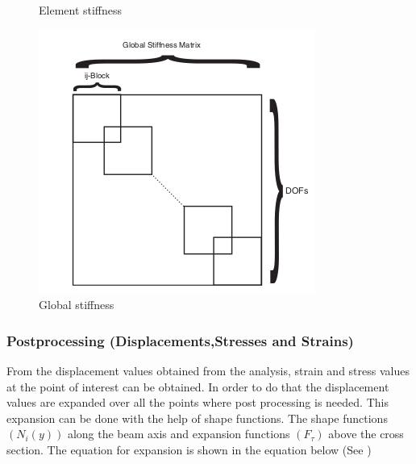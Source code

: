 \documentclass[a4paper,12pt]{article}
\begin{document}
\begin{figure}[!htbp]
\begin{minipage}[b]{0.35\textwidth}
    \caption{Element stiffness}
    \label{Elemental}
  \end{minipage}
  \hfill
  \begin{minipage}[b]{0.35\textwidth}
    \includegraphics[width=\textwidth]{5.png}
    \caption{Global stiffness}
    \label{Global}
  \end{minipage}
\end{figure}


\subsubsection*{Postprocessing (Displacements,Stresses and Strains)}
\indent\indent\indent From the displacement values obtained from the analysis,  strain and stress values at the point of interest can be obtained. In order to do that the displacement values are expanded over all the points where post processing is needed. This expansion can be done with the help of shape functions. The shape functions $(N_{i}(y))$ along the beam axis and expansion functions $(F_{\tau})$ above the cross section. The equation for expansion is shown in the equation below (See \cite{carrera2014finite})
\end{document}
